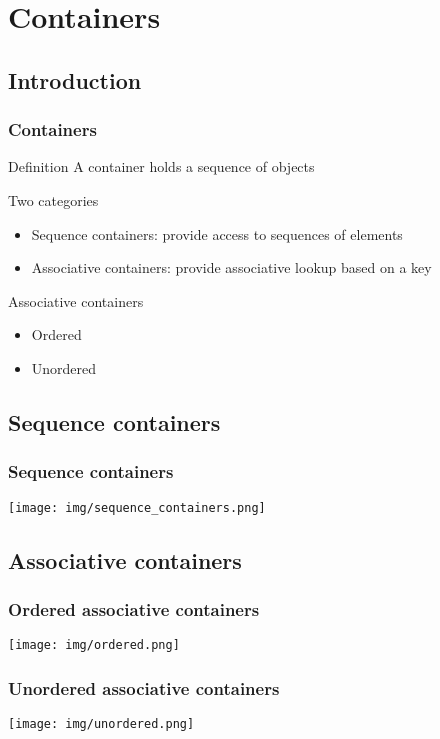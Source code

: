 \section{Containers}
\subsection{Introduction}
\begin{frame}
  \frametitle{Containers}
  \begin{block}{Definition}
    A container holds a sequence of objects
  \end{block}
  \vfill
  \begin{block}{Two categories}
    \begin{itemize}
    \item Sequence containers: provide access to sequences of elements
    \item Associative containers: provide associative lookup based on a key
    \end{itemize}
  \end{block}
  \vfill
  \begin{block}{Associative containers}
    \begin{itemize}
    \item Ordered
    \item Unordered
    \end{itemize}
  \end{block}
\end{frame}

\subsection{Sequence containers}
\begin{frame}
  \frametitle{Sequence containers}
  \centering
  \texttt{[image: img/sequence\_containers.png]}
\end{frame}

\subsection{Associative containers}
\begin{frame}
  \frametitle{Ordered associative containers}
  \centering
  \texttt{[image: img/ordered.png]}
\end{frame}
\begin{frame}
  \frametitle{Unordered associative containers}
  \centering
  \texttt{[image: img/unordered.png]}
\end{frame}


